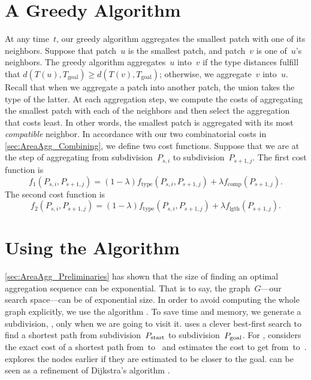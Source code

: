 \section{A Greedy Algorithm}
\label{sec:AreaAgg_Greedy}
At any time~$t$,
our greedy algorithm aggregates the smallest patch
with one of its neighbors.
Suppose that patch~$u$ is the smallest patch,
and patch~$v$ is one of~$u$'s neighbors.
The greedy algorithm aggregates~$u$ into~$v$ 
if the type distances fulfill that
$d\left(T(u), T_\mathrm{goal}\right) 
\ge d\left(T(v), T_\mathrm{goal}\right)$;
otherwise, we aggregate~$v$ into~$u$.
Recall that when we aggregate a patch into another patch,
the union takes the type of the latter.
At each aggregation step,
we compute the costs of aggregating the smallest patch 
with each of the neighbors
and then select the aggregation that costs least.
In other words, the smallest patch is aggregated with 
its most \emph{compatible} neighbor.
In accordance with our two combinatorial costs in 
\sect\ref{sec:AreaAgg_Combining},
we define two cost functions.
Suppose that we are at the step of aggregating 
from subdivision~$P_{s,i}$ to subdivision~$P_{s+1,j}$.
The first cost function is 
\begin{equation}
\label{eq:f_1}
f_1(P_{s,i},P_{s+1,j})=
(1-\lambda)f_\mathrm{type}(P_{s,i},P_{s+1,j})
+\lambda f_{\mathrm{comp}}(P_{s+1,j}). \nonumber
\end{equation}
The second cost function is
\begin{equation}
\label{eq:f_2}
f_2(P_{s,i},P_{s+1,j})=
(1-\lambda)f_\mathrm{type}(P_{s,i},P_{s+1,j})
+\lambda f_{\mathrm{lgth}}(P_{s+1,j}). \nonumber
\end{equation}



\section{Using the \Astar Algorithm}
\label{sec:AreaAgg_AStar}

\sect\ref{sec:AreaAgg_Preliminaries} has shown that
the size of finding an optimal aggregation sequence 
can be exponential.
That is to say, the graph~$G$---our search space---can 
be of exponential size.
In order to avoid computing the whole graph explicitly,
we use the \Astar algorithm \parencite{Hart1968,PatelAStar}.
To save time and memory, 
we generate a subdivision, \Pnode, only 
when we are going to visit it.
\Astar uses a clever best-first search 
to find a shortest path 
from subdivision~$P_\mathrm{start}$ to subdivision~$P_\mathrm{goal}$.  
For \Pnode,
\Astar considers the exact cost of a shortest path 
from~\Pstart to~\Pnode 
and estimates the cost to get from~\Pnode to~\Pgoal. 
\Astar explores the nodes earlier 
if they are estimated to be closer to the goal.
\Astar can be seen as a refinement of Dijkstra's algorithm
\parencite{Dijkstra1959}.

